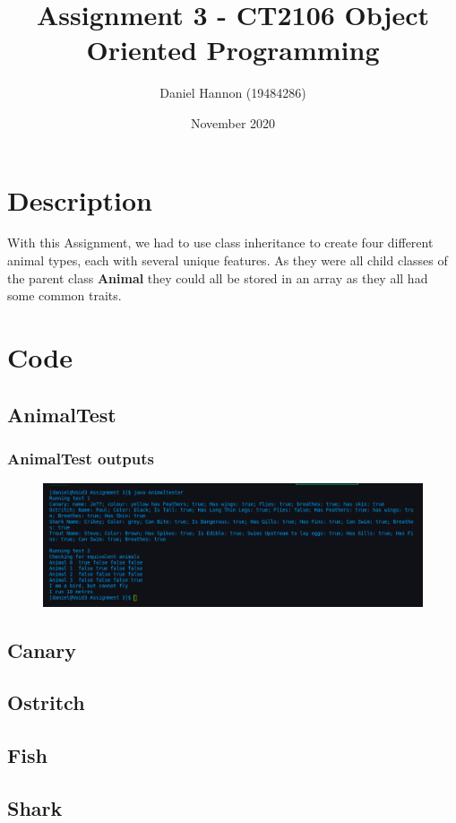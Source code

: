 \documentclass{article}
\title{Assignment 3 - CT2106 Object Oriented Programming}
\author{Daniel Hannon (19484286)}
\date{November 2020}
\begin{document}
	\maketitle
	\section{Description}
	With this Assignment, we had to use class inheritance to create four different animal types, each with several unique features. As they were all child classes of the parent class \textbf{Animal} they could all be stored in an array as they all had some common traits. 
	\section{Code}
	\subsection{AnimalTest}
	\subsubsection{AnimalTest outputs}
	\begin{figure}[h!]
		\centering
		\includegraphics[width=\textwidth]{outputs.png}
	\end{figure}
	\subsection{Canary}
	\subsection{Ostritch}
	\subsection{Fish}
	\subsection{Shark}
\end{document}
